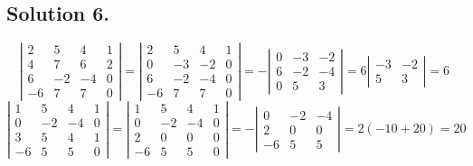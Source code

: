 \documentclass{article}
\begin{document}
\subsection*{Solution 6.}
\[\left\vert\begin{array}{rrrr}
2 & 5 & 4 & 1 \\
4 & 7 & 6 & 2 \\
6 & -2 & -4 & 0\\
-6 & 7 & 7 & 0
\end{array}\right\vert
=
\left\vert\begin{array}{rrrr}
2 & 5 & 4 & 1 \\
0 & -3 & -2 & 0 \\
6 & -2 & -4 & 0\\
-6 & 7 & 7 & 0
\end{array}\right\vert
=-
\left\vert\begin{array}{rrr}
0 & -3 & -2 \\
6 & -2 & -4 \\
0 & 5 & 3 
\end{array}\right\vert
=6\left\vert\begin{array}{rr}
 -3 & -2 \\
 5 & 3 
\end{array}\right\vert=6
\]
\[
\left\vert\begin{array}{rrrr}
1 & 5 & 4 & 1 \\
0 & -2 & -4 & 0 \\
3 & 5 & 4 & 1 \\
-6 & 5 & 5 & 0
\end{array}\right\vert
=
\left\vert\begin{array}{rrrr}
1 & 5 & 4 & 1 \\
0 & -2 & -4 & 0 \\
2 & 0 & 0 & 0 \\
-6 & 5 & 5 & 0
\end{array}\right\vert
=-
\left\vert\begin{array}{rrr}
0 & -2 & -4 \\
2 & 0 & 0  \\
-6 & 5 & 5 
\end{array}\right\vert
=2(-10+20)=20
\]
\end{document}
